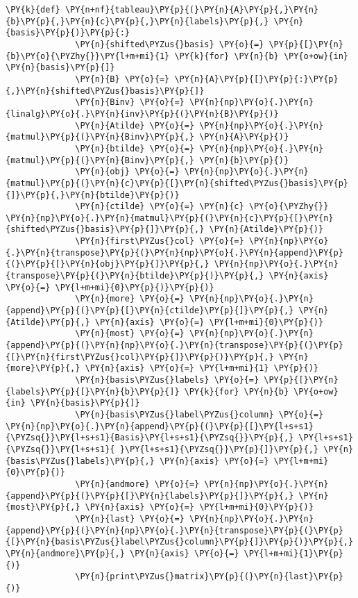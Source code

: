 \begin{Verbatim}[commandchars=\\\{\}]
          \PY{k}{def} \PY{n+nf}{tableau}\PY{p}{(}\PY{n}{A}\PY{p}{,}\PY{n}{b}\PY{p}{,}\PY{n}{c}\PY{p}{,}\PY{n}{labels}\PY{p}{,} \PY{n}{basis}\PY{p}{)}\PY{p}{:}
              \PY{n}{shifted\PYZus{}basis} \PY{o}{=} \PY{p}{[}\PY{n}{b}\PY{o}{\PYZhy{}}\PY{l+m+mi}{1} \PY{k}{for} \PY{n}{b} \PY{o+ow}{in} \PY{n}{basis}\PY{p}{]}
              \PY{n}{B} \PY{o}{=} \PY{n}{A}\PY{p}{[}\PY{p}{:}\PY{p}{,}\PY{n}{shifted\PYZus{}basis}\PY{p}{]}
              \PY{n}{Binv} \PY{o}{=} \PY{n}{np}\PY{o}{.}\PY{n}{linalg}\PY{o}{.}\PY{n}{inv}\PY{p}{(}\PY{n}{B}\PY{p}{)}
              \PY{n}{Atilde} \PY{o}{=} \PY{n}{np}\PY{o}{.}\PY{n}{matmul}\PY{p}{(}\PY{n}{Binv}\PY{p}{,} \PY{n}{A}\PY{p}{)}
              \PY{n}{btilde} \PY{o}{=} \PY{n}{np}\PY{o}{.}\PY{n}{matmul}\PY{p}{(}\PY{n}{Binv}\PY{p}{,} \PY{n}{b}\PY{p}{)}
              \PY{n}{obj} \PY{o}{=} \PY{n}{np}\PY{o}{.}\PY{n}{matmul}\PY{p}{(}\PY{n}{c}\PY{p}{[}\PY{n}{shifted\PYZus{}basis}\PY{p}{]}\PY{p}{,}\PY{n}{btilde}\PY{p}{)}
              \PY{n}{ctilde} \PY{o}{=} \PY{n}{c} \PY{o}{\PYZhy{}} \PY{n}{np}\PY{o}{.}\PY{n}{matmul}\PY{p}{(}\PY{n}{c}\PY{p}{[}\PY{n}{shifted\PYZus{}basis}\PY{p}{]}\PY{p}{,} \PY{n}{Atilde}\PY{p}{)}
              \PY{n}{first\PYZus{}col} \PY{o}{=} \PY{n}{np}\PY{o}{.}\PY{n}{transpose}\PY{p}{(}\PY{n}{np}\PY{o}{.}\PY{n}{append}\PY{p}{(}\PY{p}{[}\PY{n}{obj}\PY{p}{]}\PY{p}{,} \PY{n}{np}\PY{o}{.}\PY{n}{transpose}\PY{p}{(}\PY{n}{btilde}\PY{p}{)}\PY{p}{,} \PY{n}{axis} \PY{o}{=} \PY{l+m+mi}{0}\PY{p}{)}\PY{p}{)}
              \PY{n}{more} \PY{o}{=} \PY{n}{np}\PY{o}{.}\PY{n}{append}\PY{p}{(}\PY{p}{[}\PY{n}{ctilde}\PY{p}{]}\PY{p}{,} \PY{n}{Atilde}\PY{p}{,} \PY{n}{axis} \PY{o}{=} \PY{l+m+mi}{0}\PY{p}{)}
              \PY{n}{most} \PY{o}{=} \PY{n}{np}\PY{o}{.}\PY{n}{append}\PY{p}{(}\PY{n}{np}\PY{o}{.}\PY{n}{transpose}\PY{p}{(}\PY{p}{[}\PY{n}{first\PYZus{}col}\PY{p}{]}\PY{p}{)}\PY{p}{,} \PY{n}{more}\PY{p}{,} \PY{n}{axis} \PY{o}{=} \PY{l+m+mi}{1} \PY{p}{)}
              \PY{n}{basis\PYZus{}labels} \PY{o}{=} \PY{p}{[}\PY{n}{labels}\PY{p}{[}\PY{n}{b}\PY{p}{]} \PY{k}{for} \PY{n}{b} \PY{o+ow}{in} \PY{n}{basis}\PY{p}{]}
              \PY{n}{basis\PYZus{}label\PYZus{}column} \PY{o}{=} \PY{n}{np}\PY{o}{.}\PY{n}{append}\PY{p}{(}\PY{p}{[}\PY{l+s+s1}{\PYZsq{}}\PY{l+s+s1}{Basis}\PY{l+s+s1}{\PYZsq{}}\PY{p}{,} \PY{l+s+s1}{\PYZsq{}}\PY{l+s+s1}{ }\PY{l+s+s1}{\PYZsq{}}\PY{p}{]}\PY{p}{,} \PY{n}{basis\PYZus{}labels}\PY{p}{,} \PY{n}{axis} \PY{o}{=} \PY{l+m+mi}{0}\PY{p}{)}
              \PY{n}{andmore} \PY{o}{=} \PY{n}{np}\PY{o}{.}\PY{n}{append}\PY{p}{(}\PY{p}{[}\PY{n}{labels}\PY{p}{]}\PY{p}{,} \PY{n}{most}\PY{p}{,} \PY{n}{axis} \PY{o}{=} \PY{l+m+mi}{0}\PY{p}{)}
              \PY{n}{last} \PY{o}{=} \PY{n}{np}\PY{o}{.}\PY{n}{append}\PY{p}{(}\PY{n}{np}\PY{o}{.}\PY{n}{transpose}\PY{p}{(}\PY{p}{[}\PY{n}{basis\PYZus{}label\PYZus{}column}\PY{p}{]}\PY{p}{)}\PY{p}{,} \PY{n}{andmore}\PY{p}{,} \PY{n}{axis} \PY{o}{=} \PY{l+m+mi}{1}\PY{p}{)}
              \PY{n}{print\PYZus{}matrix}\PY{p}{(}\PY{n}{last}\PY{p}{)}
\end{Verbatim}

